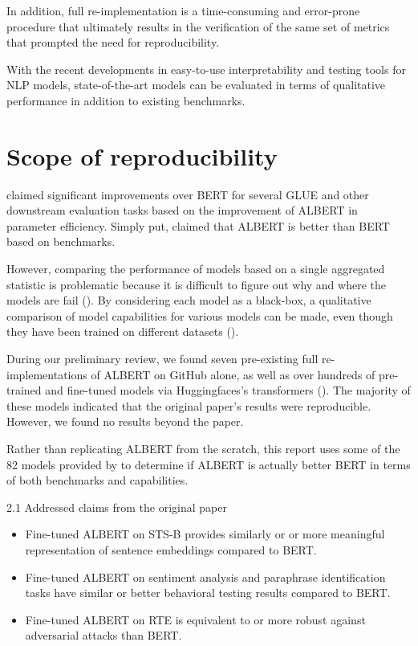 \documentclass{article}
\begin{document}
In addition, full re-implementation is a time-consuming and error-prone procedure that ultimately results in the verification of the same set of metrics that prompted the need for reproducibility.

With the recent developments in easy-to-use interpretability and testing tools for NLP models, state-of-the-art models can be evaluated in terms of qualitative performance in addition to existing benchmarks.

\section{Scope of reproducibility}

\citet{Lan2020ALBERT} claimed significant improvements over BERT for several GLUE and other downstream evaluation tasks based on the improvement of ALBERT in parameter efficiency. Simply put, \citet{Lan2020ALBERT} claimed that ALBERT is better than BERT based on benchmarks.

However, comparing the performance of models based on a single aggregated statistic is problematic because it is difficult to figure out why and where the models are fail (\citet{wu-etal-2019-errudite}). By considering each model as a black-box, a qualitative comparison of model capabilities for various models can be made, even though they have been trained on different datasets (\citet{Ribeiro2020BeyondAB}).

During our preliminary review, we found seven pre-existing full re-implementations of ALBERT on GitHub alone, as well as over hundreds of pre-trained and fine-tuned models via Huggingfaces's transformers (\citet{Wolf2019HuggingFacesTS}). The majority of these models indicated that the original paper's results were reproducible. However, we found no results beyond the paper.

Rather than replicating ALBERT from the scratch, this report uses some of the 82 models provided by \citet{Morris2020TextAttackAF} to determine if ALBERT is actually better BERT in terms of both benchmarks and capabilities.

2.1 Addressed claims from the original paper

\begin{itemize}
    \item Fine-tuned ALBERT on STS-B provides similarly or or more meaningful representation of sentence embeddings compared to BERT.
    \item Fine-tuned ALBERT on sentiment analysis and paraphrase identification tasks have similar or better  behavioral testing results compared to BERT.
    \item Fine-tuned ALBERT on RTE is equivalent to or more robust against adversarial attacks than BERT.
\end{itemize}
\end{document}
